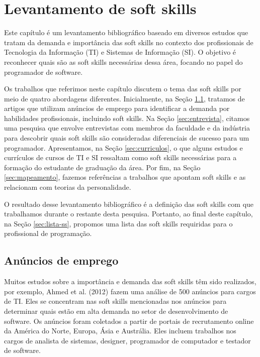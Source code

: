

\chapter{Levantamento de soft skills}

\label{chap:research}

Este capítulo é um levantamento bibliográfico baseado em diversos estudos que tratam da demanda e importância das soft skills no contexto dos profissionais de Tecnologia da Informação (TI) e Sistemas de Informação (SI). O objetivo é reconhecer quais são as soft skills necessárias dessa área, focando no papel do programador de software.

Os trabalhos que referimos neste capítulo discutem o tema das soft skills por meio de quatro abordagens diferentes. 
Inicialmente, na Seção \ref{sec:anuncios}, tratamos de artigos que utilizam anúncios de emprego para identificar a demanda por habilidades profissionais, incluindo soft skills. Na Seção \ref{sec:entrevista}, citamos uma pesquisa que envolve entrevistas com membros da faculdade e da indústria para descobrir quais soft skills são consideradas diferenciais de sucesso para um programador. Apresentamos, na Seção \ref{sec:curriculos}, o que alguns estudos e currículos de cursos de TI e SI ressaltam como soft skills necessárias para a formação do estudante de graduação da área. Por fim, na Seção \ref{sec:mapeamento}, fazemos referências a trabalhos que apontam soft skills e as relacionam com teorias da personalidade.

O resultado desse levantamento bibliográfico é a definição das soft skills com que trabalhamos durante o restante desta pesquisa. Portanto, ao final deste capítulo, na Seção \ref{sec:lista-ss}, propomos uma lista das soft skills requiridas para o profissional de programação.

\section{Anúncios de emprego}
\label{sec:anuncios}

Muitos estudos sobre a importância e demanda das soft skills têm sido realizados, por exemplo, Ahmed et al. (2012)\nocite{ahmed:12} fazem uma análise de 500 anúncios para cargos de TI. Eles se concentram nas soft skills mencionadas nos anúncios para determinar quais estão em alta demanda no setor de desenvolvimento de software. Os anúncios foram coletados a partir de portais de recrutamento online da América do Norte, Europa, Ásia e Austrália. Eles incluem trabalhos nos cargos de analista de sistemas, designer, programador de computador e testador de software.

